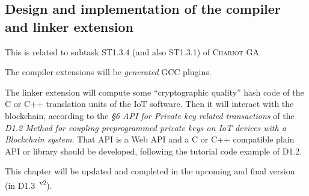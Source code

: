 \subsection{Design and implementation of the compiler and linker extension}

\label{subsec:compilinkext}
This is related to subtask ST1.3.4 (and also ST1.3.1) of \textsc{Chariot} GA 

The compiler extensions will be \emph{generated} GCC plugins.

The linker extension will compute some ``cryptographic quality'' hash
code of the C or C++ translation units of the IoT software. Then it
will interact with the blockchain, according to the \emph{§6 API for
  Private key related transactions} of the \emph{D1.2 Method for
  coupling preprogrammed private keys on IoT devices with a Blockchain
  system}. That API is a Web API and a C or C++ compatible plain API
or library should be developed, following the tutorial code example of
D1.2.

This chapter will be updated and completed in the upcoming and final
version (in D1.3~\textsuperscript{v2}).
